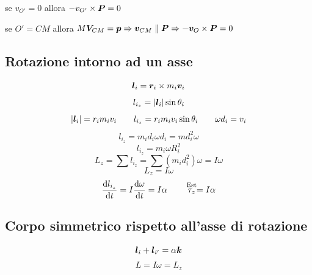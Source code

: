 se $v_{O'}=0$ allora $-v_{O'}\times\boldsymbol{P}=0$

se $O'=CM$ allora $M\boldsymbol{V}_{CM}=\boldsymbol{p}\Rightarrow\boldsymbol{v}_{CM}\parallel\boldsymbol{P}\Rightarrow -\boldsymbol{v}_O\times\boldsymbol{P}=0$

\subsection{Rotazione intorno ad un asse}
\begin{equation*}\boldsymbol{l}_i=\boldsymbol{r}_i\times m_i\boldsymbol{v}_i\end{equation*}
\begin{equation*}l_{i_z}=|\boldsymbol{l}_i|\sin\theta_i\end{equation*}
$$|\boldsymbol{l}_i|=r_im_iv_i\qquad l_{i_z}=r_im_iv_i\sin\theta_i\qquad
\omega d_i=v_i$$
\begin{equation*}l_{i_z}=m_id_i\omega d_i=md_i^2\omega\end{equation*}
\begin{equation*}l_{i_z}=m_i\omega R_i^2\end{equation*}
\begin{equation*}L_z=\sum l_{i_z}=\sum(m_id_i^2)\omega=I\omega\end{equation*}
\begin{equation*}L_z=I\omega\end{equation*}
$$\frac{\mathrm{d} l_{i_z}}{\mathrm{d} t}=I\frac{\mathrm{d} \omega}{\mathrm{d}
t}=I\alpha\qquad \stackrel{\text{Est}}{\tau_{z}}=I\alpha$$
\subsection{Corpo simmetrico rispetto all'asse di rotazione}
\begin{equation*}\boldsymbol{l}_i+\boldsymbol{l}_{i'}=\alpha\boldsymbol{k}\end{equation*}
\begin{equation*}L=I\omega=L_z\end{equation*}


